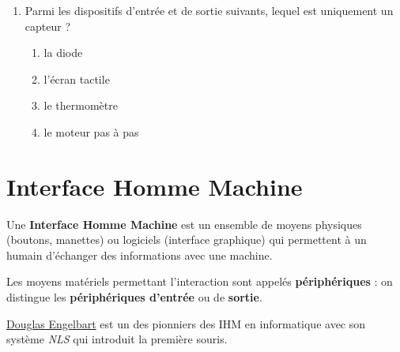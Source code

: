 \begin{exerciceB2}{}
\begin{enumerate}
\item Parmi les dispositifs d'entrée et de sortie suivants, lequel est
uniquement un capteur ?

\begin{multicols}{2}
\begin{enumerate}
\item la diode
\item l'écran tactile
\item le thermomètre
\item le moteur pas à pas

\end{enumerate}
\end{multicols}
\end{enumerate}

\end{exerciceB2}

 
\section{Interface Homme Machine}

\begin{definition}{}
Une \textbf{Interface Homme Machine} est un ensemble de moyens physiques (boutons, manettes) ou logiciels (interface graphique) qui permettent à un humain d'échanger des informations avec une machine.

Les moyens matériels permettant l'interaction sont appelés \textbf{périphériques} : on distingue les \textbf{périphériques d'entrée} ou de \textbf{sortie}. 

\href{https://interstices.info/50-ans-dinteraction-homme-machine-retours-vers-le-futur/}{Douglas Engelbart} est un des pionniers des IHM en informatique avec son système \textit{NLS} qui introduit  la première souris.
\end{definition}



